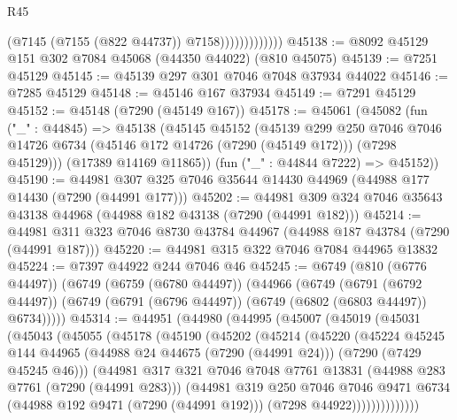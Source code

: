 \begin{lexlean}{R45}
\begin{coremodule}
{                            (@7145 (@7155 (@822 @44737)) @7158)))))))))))))
@45138 := @8092 @45129 @151 @302 @7084 @45068 (@44350 @44022) (@810 @45075)
@45139 := @7251 @45129
@45145 := @45139 @297 @301 @7046 @7048 @37934 @44022
@45146 := @7285 @45129
@45148 := @45146 @167 @37934
@45149 := @7291 @45129
@45152 := @45148 (@7290 (@45149 @167))
@45178 := @45061
    (@45082
      (fun ("_" : @44845) =>
      @45138
        (@45145
          @45152
          (@45139
            @299
            @250
            @7046
            @7046
            @14726
            @6734
            (@45146 @172 @14726 (@7290 (@45149 @172)))
            (@7298 @45129)))
        (@17389 @14169 @11865))
      (fun ("_" : @44844 @7222) => @45152))
@45190 := @44981 @307 @325 @7046 @35644 @14430 @44969 (@44988 @177 @14430 (@7290 (@44991 @177)))
@45202 := @44981 @309 @324 @7046 @35643 @43138 @44968 (@44988 @182 @43138 (@7290 (@44991 @182)))
@45214 := @44981 @311 @323 @7046 @8730 @43784 @44967 (@44988 @187 @43784 (@7290 (@44991 @187)))
@45220 := @44981 @315 @322 @7046 @7084 @44965 @13832
@45224 := @7397 @44922 @244 @7046 @46
@45245 := @6749
    (@810 (@6776 @44497))
    (@6749
      (@6759 (@6780 @44497))
      (@44966
        (@6749
          (@6791 (@6792 @44497))
          (@6749 (@6791 (@6796 @44497)) (@6749 (@6802 (@6803 @44497)) @6734)))))
@45314 := @44951
    (@44980
      (@44995
        (@45007
          (@45019
            (@45031
              (@45043
                (@45055
                  (@45178
                    (@45190
                      (@45202
                        (@45214
                          (@45220
                            (@45224
                              @45245
                              @144
                              @44965
                              (@44988 @24 @44675 (@7290 (@44991 @24)))
                              (@7290 (@7429 @45245 @46)))
                            (@44981
                              @317
                              @321
                              @7046
                              @7048
                              @7761
                              @13831
                              (@44988 @283 @7761 (@7290 (@44991 @283)))
                              (@44981
                                @319
                                @250
                                @7046
                                @7046
                                @9471
                                @6734
                                (@44988 @192 @9471 (@7290 (@44991 @192)))
                                (@7298 @44922))))))))))))))
}
\end{coremodule}
\end{lexlean}
